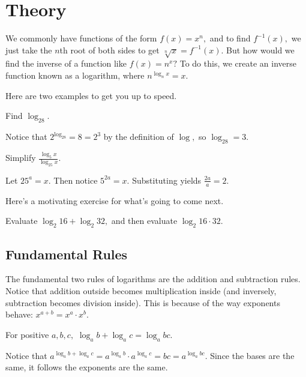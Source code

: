 \section{Theory}
We commonly have functions of the form $f(x)=x^n,$ and to find $f^{-1}(x),$ we just take the $n$th root of both sides to get $\sqrt[n]{x}=f^{-1}(x).$ But how would we find the inverse of a function like $f(x)=n^x?$ To do this, we create an inverse function known as a logarithm, where $n^{\log_nx}=x.$

Here are two examples to get you up to speed.

\begin{exam}
Find $\log_28.$
\end{exam}

\begin{sol} Notice that $2^{\log_28}=8=2^3$ by the definition of $\log,$ so $\log_28=3.$\end{sol}

\begin{exam}
Simplify $\frac{\log_5x}{\log_{25}x}.$
\end{exam}

\begin{sol}
Let $25^a=x.$ Then notice $5^{2a}=x.$ Substituting yields $\frac{2a}{a}=2.$
\end{sol}

Here's a motivating exercise for what's going to come next.

\begin{exer}
Evaluate $\log_2{16}+\log_2{32},$ and then evaluate $\log_2{16\cdot 32}.$
\end{exer}

\subsection{Fundamental Rules}
The fundamental two rules of logarithms are the addition and subtraction rules. Notice that addition outside becomes multiplication inside (and inversely, subtraction becomes division inside). This is because of the way exponents behave: $x^{a+b}=x^a\cdot x^b.$

\begin{theo}
For positive $a,b,c,$ $\log_{a}b+\log_{a}c=\log_{a}{bc}.$
\end{theo}

\begin{pro}
Notice that $a^{\log_ab+\log_ac}=a^{\log_ab}\cdot a^{\log_ac}=bc=a^{\log_abc}.$ Since the bases are the same, it follows the exponents are the same.
\end{pro}

